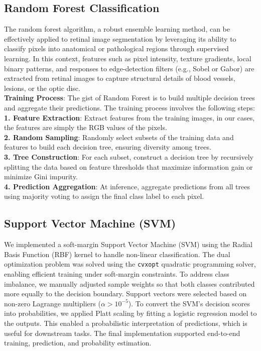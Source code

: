 \documentclass[final]{article}
\begin{document}
\subsection{Random Forest Classification}
The random forest algorithm, a robust ensemble learning method, can be effectively applied to retinal image segmentation by leveraging its ability to classify pixels into anatomical or pathological regions through supervised learning. In this context, features such as pixel intensity, texture gradients, local binary patterns, and responses to edge-detection filters (e.g., Sobel or Gabor) are extracted from retinal images to capture structural details of blood vessels, lesions, or the optic disc. \\
\textbf{Training Process}: The gist of Random Forest is to build multiple decision trees and aggregate their predictions. The training process involves the following steps: \\
\textbf{1. Feature Extraction}: Extract features from the training images, in our cases, the features are simply the RGB values of the pixels. \\
\textbf{2. Random Sampling}: Randomly select subsets of the training data and features to build each decision tree, ensuring diversity among trees. \\
\textbf{3. Tree Construction}: For each subset, construct a decision tree by recursively splitting the data based on feature thresholds that maximize information gain or minimize Gini impurity. \\
\textbf{4. Prediction Aggregation}: At inference, aggregate predictions from all trees using majority voting to assign the final class label to each pixel.
\subsection{Support Vector Machine (SVM)}
We implemented a soft-margin Support Vector Machine (SVM) using the Radial Basis Function (RBF) kernel to handle non-linear classification. The dual optimization problem was solved using the \texttt{cvxopt} quadratic programming solver, enabling efficient training under soft-margin constraints. To address class imbalance, we manually adjusted sample weights so that both classes contributed more equally to the decision boundary. Support vectors were selected based on non-zero Lagrange multipliers (\(\alpha > 10^{-5}\)). To convert the SVM's decision scores into probabilities, we applied Platt scaling by fitting a logistic regression model to the outputs. This enabled a probabilistic interpretation of predictions, which is useful for downstream tasks. The final implementation supported end-to-end training, prediction, and probability estimation.
\end{document}

